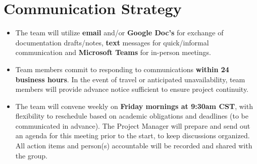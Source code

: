 \documentclass{article}
\begin{document}
\section{Communication Strategy}
\begin{tcolorbox}[colback=secondarycolor, colframe=primarycolor, arc=5mm]
\begin{itemize}
  \item The team will utilize \textbf{email} and/or \textbf{Google Doc’s} for exchange of documentation drafts/notes, \textbf{text} messages for quick/informal communication and \textbf{Microsoft Teams} for in-person meetings. 
    
 \vspace{0.2cm}
    
  \item Team members commit to responding to communications \textbf{within 24 business hours}. In the event of travel or anticipated unavailability, team members will provide advance notice sufficient to ensure project continuity.
    
  \vspace{0.2cm}  
  
  \item The team will convene weekly on \textbf{Friday mornings at 9:30am CST}, with flexibility to reschedule based on academic obligations and deadlines (to be communicated in advance). The Project Manager will prepare and send out an agenda for this meeting prior to the start, to keep discussions organized. All action items and person(s) accountable will be recorded and shared with the group.

\end{itemize}
\end{tcolorbox}

\vspace{0.5cm}
\end{document}

